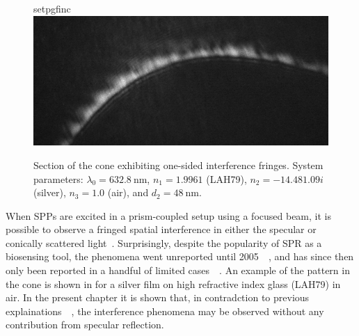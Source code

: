 \begin{figure}[ht]
 \centering
 {setpgfinc}
 \includegraphics[keepaspectratio,width=15.5cm]{interference/figures/coneintro.png}
 \caption{Section of the cone exhibiting one-sided interference fringes.
 System parameters: $\lambda_0 = \SI{632.8}{\nano\meter}$,
 $n_1=1.9961$ (LAH79), $n_2 = \num{-14.48+1.09i}$ (silver), $n_3=1.0$
 (air), and $d_2=\SI{48}{\nano\meter}$.}
\label{fig:coneintrofig}
\end{figure}
When SPPs are excited in a prism-coupled setup using a focused beam, it is
possible to observe a fringed spatial interference in either the
specular or conically scattered light~\cite{webster2013interference}.
Surprisingly, despite the popularity of SPR as a biosensing tool, the
phenomena went unreported until
2005~\cite{schumann2008near}~\cite{andaloro2005optical}, and has since then
only been reported in a handful of limited
cases~\cite{shan2009measuring}~\cite{simon2007observation}.  An example of the
pattern in the cone is shown in  for a silver film on
high refractive index glass (LAH79) in air.  In the present chapter it is
shown that, in contradction to previous
explainations~\cite{schumann2008near}~\cite{andaloro2005optical}, the
interference phenomena may be observed without any contribution from specular
reflection.

